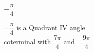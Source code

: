 {$-\dfrac{\pi}{4}$}
{$-\dfrac{\pi}{4}$ is a Quadrant IV angle \\
coterminal with $\dfrac{7 \pi}{4}$ and $-\dfrac{9\pi}{4}$

\begin{center}
\end{center}}